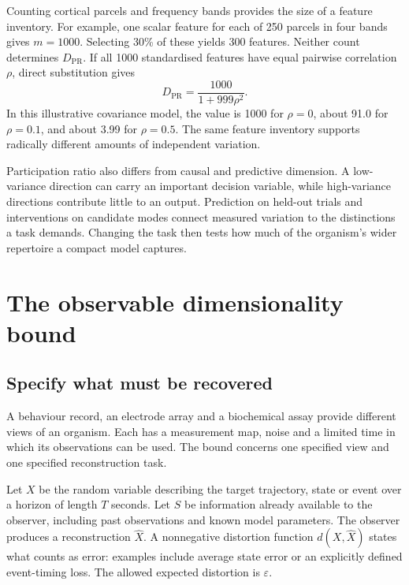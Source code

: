\documentclass[11pt,a4paper]{article}
\begin{document}
Counting cortical parcels and frequency bands provides the size of a feature inventory. For example, one scalar feature for each of 250 parcels in four bands gives \(m=1000\). Selecting 30\% of these yields 300 features. Neither count determines \(D_{\mathrm{PR}}\). If all 1000 standardised features have equal pairwise correlation \(\rho\), direct substitution gives
\begin{equation}
 D_{\mathrm{PR}}=\frac{1000}{1+999\rho^2}.
 \label{eq:equicorr}
\end{equation}
In this illustrative covariance model, the value is 1000 for \(\rho=0\), about 91.0 for \(\rho=0.1\), and about 3.99 for \(\rho=0.5\). The same feature inventory supports radically different amounts of independent variation.

Participation ratio also differs from causal and predictive dimension. A low-variance direction can carry an important decision variable, while high-variance directions contribute little to an output. Prediction on held-out trials and interventions on candidate modes connect measured variation to the distinctions a task demands. Changing the task then tests how much of the organism's wider repertoire a compact model captures.

\section{The observable dimensionality bound}
\label{sec:bound}

\subsection{Specify what must be recovered}

A behaviour record, an electrode array and a biochemical assay provide different views of an organism. Each has a measurement map, noise and a limited time in which its observations can be used. The bound concerns one specified view and one specified reconstruction task.

Let \(X\) be the random variable describing the target trajectory, state or event over a horizon of length \(T\) seconds. Let \(S\) be information already available to the observer, including past observations and known model parameters. The observer produces a reconstruction \(\widehat X\). A nonnegative distortion function \(d(X,\widehat X)\) states what counts as error: examples include average state error or an explicitly defined event-timing loss. The allowed expected distortion is \(\varepsilon\).
\end{document}
